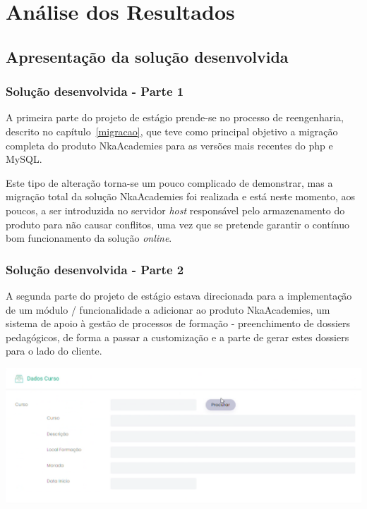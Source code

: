 
\chapter{Análise dos Resultados}
\label{analise}
\section{Apresentação da solução desenvolvida}
\label{app}
\subsection{Solução desenvolvida - Parte 1}

A primeira parte do projeto de estágio prende-se no processo de reengenharia, descrito no capítulo~\ref{migracao}, que teve como principal objetivo a migração completa do produto NkaAcademies para as versões mais recentes do \acrshort{php} e MySQL.

Este tipo de alteração torna-se um pouco complicado de demonstrar, mas a migração total da solução NkaAcademies foi realizada e está neste momento, aos poucos, a ser introduzida no servidor \textit{host} responsável pelo armazenamento do produto para não causar conflitos, uma vez que se pretende garantir o contínuo bom funcionamento da solução \textit{online}.

\subsection{Solução desenvolvida - Parte 2}

A segunda parte do projeto de estágio estava direcionada para a implementação de um módulo / funcionalidade a adicionar ao produto NkaAcademies, um sistema de apoio à gestão de processos de formação - preenchimento de dossiers pedagógicos, de forma a passar a customização e a parte de gerar estes dossiers para o lado do cliente.

\begin{center}
        \includegraphics[width=\textwidth,height=\textheight,keepaspectratio]{images/dadoscurso.png}
        \label{fig:dadoscurso}
\end{center}

